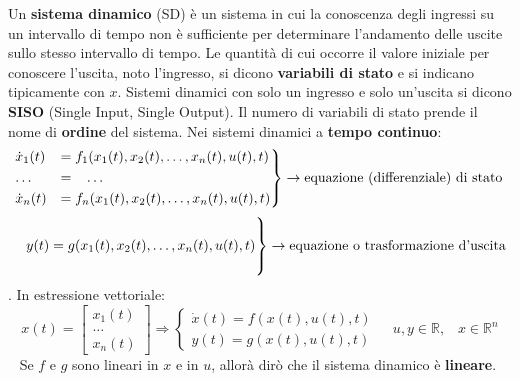 Un \textbf{sistema dinamico} (SD) è un sistema in cui la conoscenza degli ingressi su un intervallo di tempo non è sufficiente per determinare l'andamento delle uscite sullo stesso intervallo di tempo.\newline
\newline
Le quantità di cui occorre il valore iniziale per conoscere l'uscita, noto l'ingresso, si dicono \textbf{variabili di stato} e si indicano tipicamente con $x$.\newline
\newline
Sistemi dinamici con solo un ingresso e solo un'uscita si dicono \textbf{SISO} (Single Input, Single Output).\newline
\newline
Il numero di variabili di stato prende il nome di \textbf{ordine} del sistema.\newline
\newline
Nei sistemi dinamici a \textbf{tempo continuo}:
\[
    \begin{rcases}
        \dot{x}_1(t) &= f_1(x_1(t),x_2(t), \dots, x_n(t), u(t), t)\\
        \dots \;\;\;&= \;\;\;\dots\\
        \dot{x}_n(t) &= f_n(x_1(t),x_2(t), \dots, x_n(t), u(t), t)
    \end{rcases} \rightarrow \text{equazione (differenziale) di stato}\;
\]
\[
    \begin{rcases}
        \\
        \;\;\;\; y(t) = g(x_1(t),x_2(t), \dots, x_n(t), u(t), t)\\
        \\
    \end{rcases} \rightarrow \text{equazione o trasformazione d'uscita}\;
\].\newline
In estressione vettoriale:
\[
    x(t) = \left[\begin{matrix}
        x_1(t)\\
        \dots\\
        x_n(t)
    \end{matrix}\right] \Rightarrow  \begin{cases}
        \dot{x}(t) = f(x(t), u(t),t)\\
        y(t) = g(x(t),u(t),t)
    \end{cases} \;\;\;\;u,y \in \mathbb{R}, \;\;\;x \in \mathbb{R}^n
\]
\ \newline
\newline
Se $f$ e $g$ sono lineari in $x$ e in $u$, allorà dirò che il sistema dinamico è \textbf{lineare}.\newline
